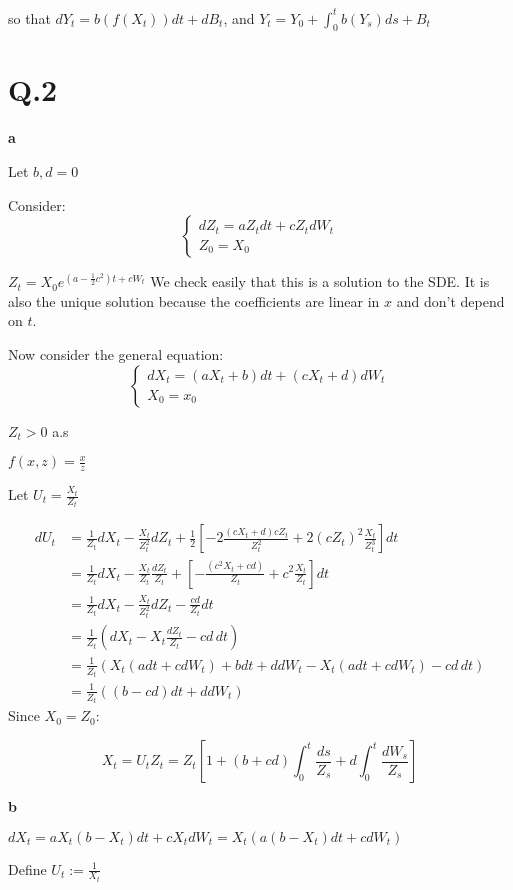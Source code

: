 \documentclass[11pt]{article}
\begin{document}
so that \(dY_t = b(f(X_t)) dt + dB_t\), and \(Y_t = Y_0 + \int_0^t b(Y_s) ds + B_t\)

\section{Q.2}
\label{sec:orgheadline5}
\textbf{a}

Let \(b, d = 0\)

Consider:
\[\left\{\begin{array}{c}dZ_t = aZ_tdt + cZ_t dW_t\\Z_0 = X_0\end{array}\right.\]

\(Z_t = X_0e^{(a-\frac12 c^2) t + cW_t}\)
We check easily that this is a solution to the SDE. It is also the unique solution because the coefficients are linear in \(x\) and don't depend on \(t\).

Now consider the general equation:
\[\left\{\begin{array}{c}dX_t = (aX_t+b)dt + (cX_t+d) dW_t\\X_0 = x_0\end{array}\right.\]

\(Z_t > 0\) a.s

\(f(x, z) = \frac xz\)

Let \(U_t = \frac{X_t}{Z_t}\)

\begin{align*}
dU_t &= \frac1{Z_t} dX_t - \frac{X_t}{Z_t^2}dZ_t + \frac12 [ -2\frac{(cX_t+d)cZ_t}{Z_t^2} + 2(cZ_t)^2\frac{X_t}{Z_t^3}]dt
\\&= \frac1{Z_t} dX_t - \frac{X_t}{Z_t}\frac{dZ_t}{Z_t} + [ -\frac{(c^2X_t+cd)}{Z_t} + c^2\frac{X_t}{Z_t}]dt
\\&= \frac1{Z_t} dX_t - \frac{X_t}{Z_t^2}dZ_t - \frac{cd}{Z_t} dt
\\&= \frac1{Z_t} (dX_t - X_t \frac{dZ_t}{Z_t} - cd \, dt)
\\&= \frac1{Z_t} ( X_t(a dt+c dW_t) + b dt + d dW_t - X_t (a dt+c dW_t)  - cd \, dt)
\\&= \frac1{Z_t} ((b-cd) dt + d dW_t)
\end{align*}
Since \(X_0 = Z_0\):

\[X_t = U_tZ_t = Z_t\left[1 + (b+cd) \int_0^t \frac{ds}{Z_s} + d  \int_0^t \frac{dW_s}{Z_s}\right]\]

\textbf{b}

\(dX_t = aX_t(b-X_t)dt + cX_t dW_t = X_t( a(b-X_t)dt + cdW_t)\)

Define \(U_t := \frac1{X_t}\)
\end{document}
